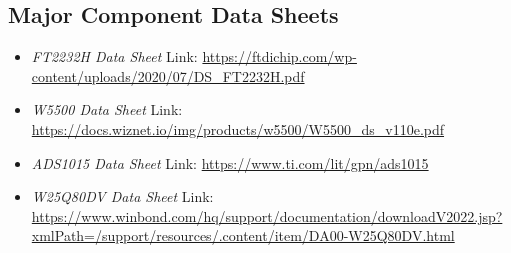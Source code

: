 \subsection{Major Component Data Sheets}
\begin{itemize}
    \item \textit{FT2232H Data Sheet} \newline
    Link: \url{https://ftdichip.com/wp-content/uploads/2020/07/DS_FT2232H.pdf}
    
    \item \textit{W5500 Data Sheet} \newline
    Link: \url{https://docs.wiznet.io/img/products/w5500/W5500_ds_v110e.pdf}
    
    \item \textit{ADS1015 Data Sheet} \newline
    Link: \url{https://www.ti.com/lit/gpn/ads1015}

    \item \textit{W25Q80DV Data Sheet} \newline
    Link: \href{https://www.winbond.com/hq/support/documentation/downloadV2022.jsp?xmlPath=/support/resources/.content/item/DA00-W25Q80DV.html}{https://www.winbond.com/hq/support/documentation/downloadV2022.jsp?xmlPath=/support/\newline{}resources/.content/item/DA00-W25Q80DV.html}
\end{itemize}
\newpage
